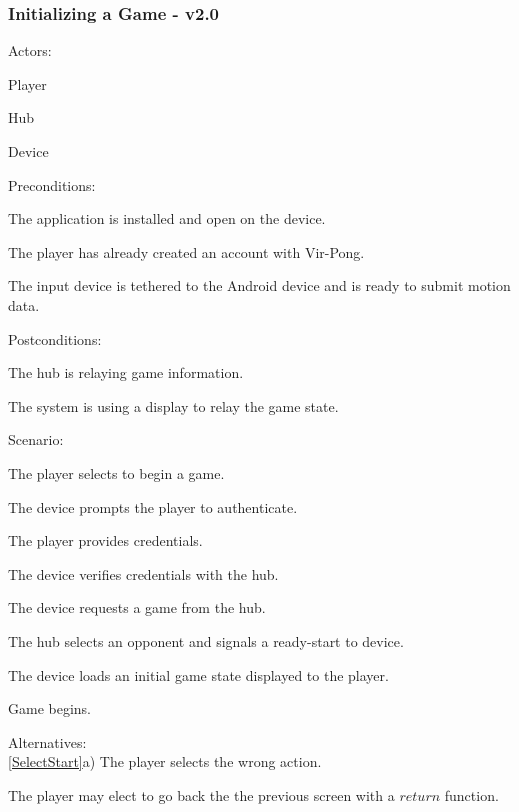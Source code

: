 \documentclass[12pt]{article}
\newenvironment{itemize*}%
  {\begin{itemize}%
  	\setlength{\parsep}{0pt}
    \setlength{\itemsep}{0pt}%
    \setlength{\parskip}{0pt}}%
  {\end{itemize}}
\newenvironment{enumerate*}%
  {\begin{enumerate}%
  	\setlength{\parsep}{0pt}
    \setlength{\itemsep}{0pt}%
    \setlength{\parskip}{0pt}}%
  {\end{enumerate}}
\begin{document}
\subsubsection*{Initializing a Game - v2.0}
Actors:
\begin{itemize*}
\item Player
\item Hub
\item Device
\end{itemize*}
Preconditions:
\begin{itemize*}
\item The application is installed and open on the device.
\item The player has already created an account with Vir-Pong.
\item The input device is tethered to the Android device and is ready to submit motion data.
\end{itemize*}
Postconditions:
\begin{itemize*}
\item The hub is relaying game information.
\item The system is using a display to relay the game state.
\end{itemize*}
Scenario:
\begin{enumerate*}
\item \label{SelectStart}The player selects to begin a game.
\item \label{SystemPromptsAuthentication}The device prompts the player to authenticate.
\item \label{PlayerProvidesCredentials}The player provides credentials.
\item \label{SystemVerifies}The device verifies credentials with the hub.
\item \label{SystemRequestsGame}The device requests a game from the hub.
\item \label{HubSelectsOpponent}The hub selects an opponent and signals a ready-start to device.
\item \label{LoadGameState}The device loads an initial game state displayed to the player.
\item Game begins.
\end{enumerate*}
Alternatives:\\
\ref{SelectStart}a) The player selects the wrong action.
\begin{enumerate*}
\item The player may elect to go back the the previous screen with a $return$ function.
\end{enumerate*}
\end{document}
